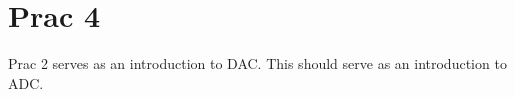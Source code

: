 \section{Prac 4}
Prac 2 serves as an introduction to DAC. 
This should serve as an introduction to ADC. 
